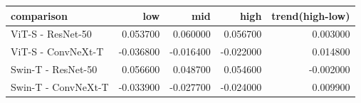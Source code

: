 \begin{tabular}{lrrrr}
\toprule
comparison & low & mid & high & trend(high-low) \\
\midrule
ViT-S - ResNet-50 & 0.053700 & 0.060000 & 0.056700 & 0.003000 \\
ViT-S - ConvNeXt-T & -0.036800 & -0.016400 & -0.022000 & 0.014800 \\
Swin-T - ResNet-50 & 0.056600 & 0.048700 & 0.054600 & -0.002000 \\
Swin-T - ConvNeXt-T & -0.033900 & -0.027700 & -0.024000 & 0.009900 \\
\bottomrule
\end{tabular}
